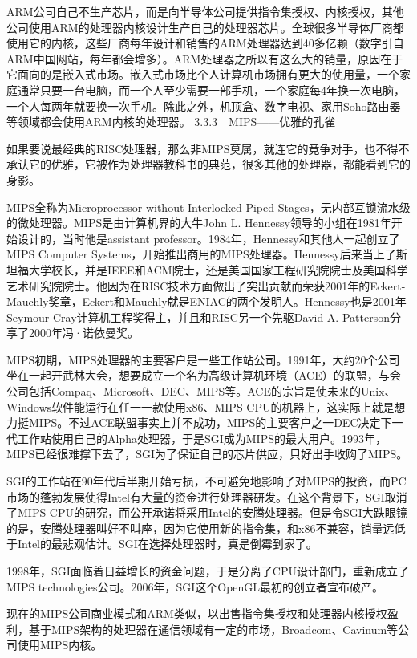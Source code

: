\documentclass[12pt,UTF8]{ctexbook}
\begin{document}
ARM公司自己不生产芯片，而是向半导体公司提供指令集授权、内核授权，其他公司使用ARM的处理器内核设计生产自己的处理器芯片。全球很多半导体厂商都使用它的内核，这些厂商每年设计和销售的ARM处理器达到40多亿颗（数字引自ARM中国网站，每年都会增多）。ARM处理器之所以有这么大的销量，原因在于它面向的是嵌入式市场。嵌入式市场比个人计算机市场拥有更大的使用量，一个家庭通常只要一台电脑，而一个人至少需要一部手机，一个家庭每4年换一次电脑，一个人每两年就要换一次手机。除此之外，机顶盒、数字电视、家用Soho路由器等领域都会使用ARM内核的处理器。
3.3.3　MIPS——优雅的孔雀

如果要说最经典的RISC处理器，那么非MIPS莫属，就连它的竞争对手，也不得不承认它的优雅，它被作为处理器教科书的典范，很多其他的处理器，都能看到它的身影。

MIPS全称为Microprocessor without Interlocked Piped Stages，无内部互锁流水级的微处理器。MIPS是由计算机界的大牛John L. Hennessy领导的小组在1981年开始设计的，当时他是assistant professor。1984年，Hennessy和其他人一起创立了MIPS Computer Systems，开始推出商用的MIPS处理器。Hennessy后来当上了斯坦福大学校长，并是IEEE和ACM院士，还是美国国家工程研究院院士及美国科学艺术研究院院士。他因为在RISC技术方面做出了突出贡献而荣获2001年的Eckert-Mauchly奖章，Eckert和Mauchly就是ENIAC的两个发明人。Hennessy也是2001年Seymour Cray计算机工程奖得主，并且和RISC另一个先驱David A. Patterson分享了2000年冯·诺依曼奖。

MIPS初期，MIPS处理器的主要客户是一些工作站公司。1991年，大约20个公司坐在一起开武林大会，想要成立一个名为高级计算机环境（ACE）的联盟，与会公司包括Compaq、Microsoft、DEC、MIPS等。ACE的宗旨是使未来的Unix、Windows软件能运行在任一一款使用x86、MIPS CPU的机器上，这实际上就是想力挺MIPS。不过ACE联盟事实上并不成功，MIPS的主要客户之一DEC决定下一代工作站使用自己的Alpha处理器，于是SGI成为MIPS的最大用户。1993年，MIPS已经很难撑下去了，SGI为了保证自己的芯片供应，只好出手收购了MIPS。

SGI的工作站在90年代后半期开始亏损，不可避免地影响了对MIPS的投资，而PC市场的蓬勃发展使得Intel有大量的资金进行处理器研发。在这个背景下，SGI取消了MIPS CPU的研究，而公开承诺将采用Intel的安腾处理器。但是令SGI大跌眼镜的是，安腾处理器叫好不叫座，因为它使用新的指令集，和x86不兼容，销量远低于Intel的最悲观估计。SGI在选择处理器时，真是倒霉到家了。

1998年，SGI面临着日益增长的资金问题，于是分离了CPU设计部门，重新成立了MIPS technologies公司。2006年，SGI这个OpenGL最初的创立者宣布破产。

现在的MIPS公司商业模式和ARM类似，以出售指令集授权和处理器内核授权盈利，基于MIPS架构的处理器在通信领域有一定的市场，Broadcom、Cavinum等公司使用MIPS内核。
\end{document}
